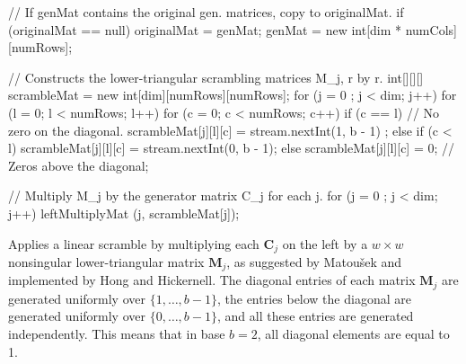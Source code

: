 \begin{code}
\begin{hide}
{      // If genMat contains the original gen. matrices, copy to originalMat.
      if (originalMat == null) {
         originalMat = genMat;
         genMat = new int[dim * numCols][numRows];
      }

      // Constructs the lower-triangular scrambling matrices M_j, r by r.
      int[][][] scrambleMat = new int[dim][numRows][numRows];
      for (j = 0 ; j < dim; j++) {
         for (l = 0; l < numRows; l++) {
            for (c = 0; c < numRows; c++) {
               if (c == l)                   // No zero on the diagonal.
                  scrambleMat[j][l][c] = stream.nextInt(1, b - 1) ;
               else if (c < l)
                  scrambleMat[j][l][c] = stream.nextInt(0, b - 1);
               else
                  scrambleMat[j][l][c] = 0;  // Zeros above the diagonal;
            }
         }
      }

      // Multiply M_j by the generator matrix C_j for each j.
      for (j = 0 ; j < dim; j++) leftMultiplyMat (j, scrambleMat[j]);
   }\end{hide}
\end{code}
 \begin{tabb}
   Applies a linear scramble by multiplying each $\mathbf{C}_j$ on the left
   by a $w\times w$ nonsingular lower-triangular matrix $\mathbf{M}_j$,
   as suggested by Matou\v{s}ek and implemented
   by Hong and Hickernell. The diagonal entries of
   each matrix $\mathbf{M}_j$ are generated uniformly over
   $\{1,\dots,b-1\}$, the entries below the diagonal are generated uniformly
   over $\{0,\dots,b-1\}$, and all these entries are generated independently.
   This means that in base $b=2$, all diagonal elements are equal to 1.
\end{tabb}
\begin{htmlonly}
\end{htmlonly}
